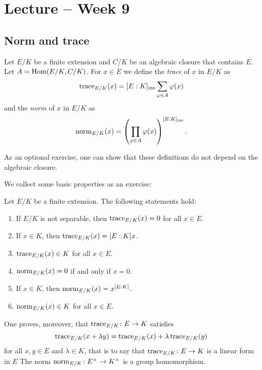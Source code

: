 \section{Lecture -- Week 9}

\subsection{Norm and trace}

\begin{definition}
    Let $E/K$ be a finite extension and $C/K$ be an algebraic closure 
    that contains $E$. Let $A=\operatorname{Hom}(E/K,C/K)$. For $x\in E$
    we define the \emph{trace} of $x$ in $E/K$ 
    as 
    \[
    \operatorname{trace}_{E/K}(x)=[E:K]_{\operatorname{ins}}\sum_{\varphi\in A}\varphi(x)
    \]
    and the \emph{norm} of $x$ in $E/K$ as
    \[
    \operatorname{norm}_{E/K}(x)=\left(\prod_{\varphi\in A}\varphi(x)\right)^{[E:K]_{\operatorname{ins}}}.
    \]
\end{definition}

As an optional exercise, one can show that these definitions do not depend on the algebraic closure. 

We collect some basic properties as an exercise:

\begin{exercise}
\label{xca:norm_and_trace}
    Let $E/K$ be a finite extension. The following statements hold:
    \begin{enumerate}
        \item If $E/K$ is not separable, then $\operatorname{trace}_{E/K}(x)=0$ for all $x\in E$.
        \item If $x\in K$, then $\operatorname{trace}_{E/K}(x)=[E:K]x$.
        \item $\operatorname{trace}_{E/K}(x)\in K$ for all $x\in E$.
        \item $\operatorname{norm}_{E/K}(x)=0$ if and only if $x=0$. 
        \item If $x\in K$, then $\operatorname{norm}_{E/K}(x)=x^{[E:K]}$. 
        \item $\operatorname{norm}_{E/K}(x)\in K$ for all $x\in E$. 
    \end{enumerate}
\end{exercise}

One proves, moreover, that  
$\operatorname{trace}_{E/K}\colon E\to K$ 
satisfies
\[
\operatorname{trace}_{E/K}(x+\lambda y)=
\operatorname{trace}_{E/K}(x)+\lambda\operatorname{trace}_{E/K}(y)
\]
for all $x,y\in E$ and $\lambda\in K$, that is to say that 
$\operatorname{trace}_{E/K}\colon E\to K$ 
is a 
linear form in $E$ The norm  
$\operatorname{norm}_{E/K}\colon E^{\times}\to K^{\times}$ 
is a group homomorphism. 

